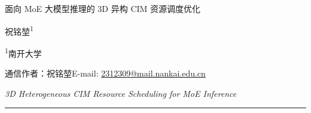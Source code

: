 \thispagestyle{empty}
\begin{center}
\vspace*{10mm}
{\heiti 面向 MoE 大模型推理的 3D 异构 CIM 资源调度优化\par}
\vspace{5mm}
{\large 祝铭堃\textsuperscript{1}\par}
\vspace{2mm}
{\normalsize \textsuperscript{1}南开大学\par}
\vspace{2mm}
{\small 通信作者：祝铭堃\quad E-mail: \href{mailto:2312309@mail.nankai.edu.cn}{2312309@mail.nankai.edu.cn}\par}
\vspace{4mm}
{\normalsize\itshape 3D Heterogeneous CIM Resource Scheduling for MoE Inference\par}
\vspace{5mm}
{\color{black!45}\rule{0.72\textwidth}{0.45pt}\par}
\end{center}

\begingroup
\small

\endgroup
